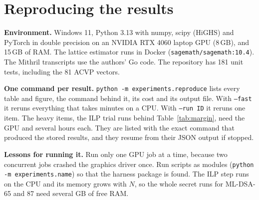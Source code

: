 \documentclass[10pt,conference,a4paper]{IEEEtran}
\begin{document}
\section{Reproducing the results}\label{app:repro}
\textbf{Environment.} Windows 11, Python 3.13 with numpy, scipy (HiGHS) and PyTorch in double precision on an NVIDIA RTX
4060 laptop GPU (8\,GB), and 15\,GB of RAM. The lattice estimator runs in Docker (\texttt{sagemath/sagemath:10.4}). The
Mithril transcripts use the authors' Go code. The repository has 181 unit tests, including the 81 ACVP vectors.

\textbf{One command per result.} \texttt{python -m experiments.reproduce} lists every table and figure, the command behind
it, its cost and its output file. With \texttt{--fast} it reruns everything that takes minutes on a CPU. With
\texttt{--run ID} it reruns one item. The heavy items, the ILP trial runs behind Table~\ref{tab:margin}, need the GPU and
several hours each. They are listed with the exact command that produced the stored results, and they resume from their
JSON output if stopped.

\textbf{Lessons for running it.} Run only one GPU job at a time, because two concurrent jobs crashed the graphics driver
once. Run scripts as modules (\texttt{python -m experiments.name}) so that the harness package is found. The ILP step runs
on the CPU and its memory grows with $N$, so the whole secret runs for ML-DSA-65 and 87 need several GB of free RAM.
\end{document}
